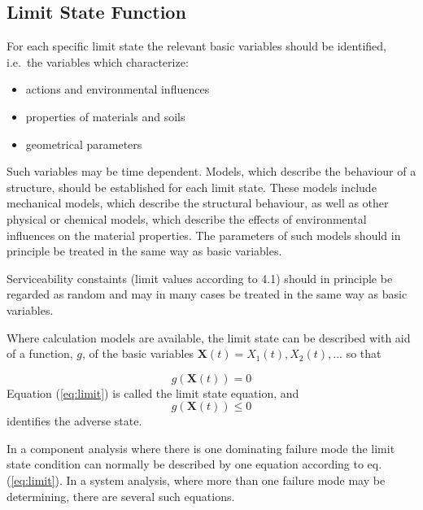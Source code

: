 \documentclass[%
oneside,                 %
final,                   %
10pt]{article}
\begin{document}
\subsection{Limit State Function}

For each specific limit state the relevant basic variables should be identified, i.e.~the variables which characterize:

\begin{itemize}
\item actions and environmental influences

\item properties of materials and soils

\item geometrical parameters
\end{itemize}

\noindent
Such variables may be time dependent. Models, which describe the behaviour of a structure, should be established for each limit state. These models include mechanical models, which describe the structural behaviour, as well as other physical or chemical models, which describe the effects of environmental influences on the material properties. The parameters of such models should in principle be treated in the same way as basic variables.

Serviceability constaints (limit values according to 4.1) should in principle be regarded as random and may in many cases be treated in the same way as basic variables.

Where calculation models are available, the limit state can be described with aid of a function, $g$, of the basic variables $\bm{X}(t) = X_1(t), X_2(t), ...$ so that

\begin{equation}
g\left(\bm{X}(t)\right)=0
\label{eq:limit}
\end{equation}
Equation (\ref{eq:limit}) is called the limit state equation, and
\begin{equation}
g\left(\bm{X}(t)\right)\leq 0
\label{eq:adverse}
\end{equation}
identifies the adverse state.

In a component analysis where there is one dominating failure mode the limit state condition can normally be described by one equation according to eq. (\ref{eq:limit}). In a system analysis, where more than one failure mode may be determining, there are several such equations.


\end{document}
